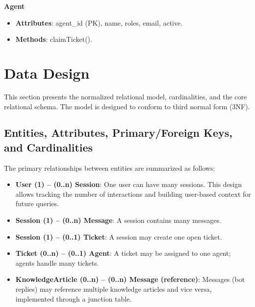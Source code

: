 \textbf{Agent}

\begin{itemize}\setlength{\itemsep}{0pt}
\item \textbf{Attributes}: agent\_id (PK), name, roles, email, active.
\item \textbf{Methods}: claimTicket().
\end{itemize}


\section{Data Design}

This section presents the normalized relational model, cardinalities, and the core relational schema. The model is designed to conform to third normal form (3NF).

\subsection{Entities, Attributes, Primary/Foreign Keys, and Cardinalities}

The primary relationships between entities are summarized as follows:

\begin{itemize}\setlength{\itemsep}{0pt}
\item \textbf{User (1) -- (0..n) Session}: One user can have many sessions. This design allows tracking the number of interactions and building user-based context for future queries.

\item \textbf{Session (1) -- (0..n) Message}: A session contains many messages.

\item \textbf{Session (1) -- (0..1) Ticket}: A session may create one open ticket.

\item \textbf{Ticket (0..n) -- (0..1) Agent}: A ticket may be assigned to one agent; agents handle many tickets.

\item \textbf{KnowledgeArticle (0..n) -- (0..n) Message (reference)}: Messages (bot replies) may reference multiple knowledge articles and vice versa, implemented through a junction table.

\end{itemize}

